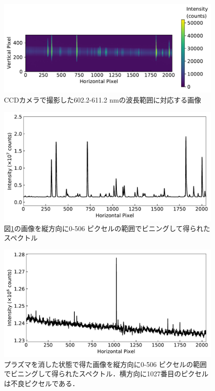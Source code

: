 \begin{figure}
    \centering
    \includegraphics[width=15cm]{pictures/picture-example.pdf}
    \caption{CCDカメラで撮影した602.2-611.2 nmの波長範囲に対応する画像}
    \label{fig:picture-example}
\end{figure}

\begin{figure}
    \centering
    \includegraphics[width=15cm]{pictures/spectrum-example.pdf}
    \caption{図\ref{fig:picture-example}の画像を縦方向に0-506 ピクセルの範囲でビニングして得られたスペクトル}
    \label{fig:spectrum-example}
\end{figure}

\begin{figure}
    \centering
    \includegraphics[width=15cm]{pictures/back-spectrum-example.pdf}
    \caption[プラズマを消した状態で得た画像を縦方向に0-506 ピクセルの範囲でビニングして得られたスペクトル]{プラズマを消した状態で得た画像を縦方向に0-506 ピクセルの範囲でビニングして得られたスペクトル．横方向に1027番目のピクセルは不良ピクセルである．}
    \label{fig:back-spectrum-example}
\end{figure}

